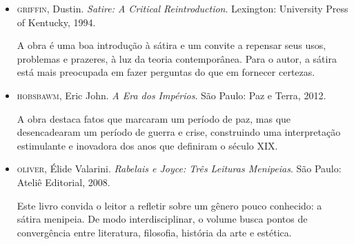 \documentclass[12pt]{extarticle}
\begin{document}
\begin{itemize}
\item\textsc{griffin}, Dustin. \textit{Satire: A Critical Reintroduction}. Lexington:
University Press of Kentucky, 1994.

A obra é uma boa introdução à sátira e um convite a repensar seus usos,
problemas e prazeres, à luz da teoria contemporânea. Para o autor, a
sátira está mais preocupada em fazer perguntas do que em fornecer
certezas.

\item\textsc{hobsbawm}, Eric John. \textit{A Era dos Impérios}. São Paulo: Paz e Terra, 2012.

A obra destaca fatos que marcaram um período de paz, mas que
desencadearam um período de guerra e crise, construindo uma
interpretação estimulante e inovadora dos anos que definiram o século
XIX.

\item\textsc{oliver}, Élide Valarini. \textit{Rabelais e Joyce: Três Leituras
Menipeias}. São Paulo: Ateliê Editorial, 2008.

Este livro convida o leitor a refletir sobre um gênero pouco conhecido:
a sátira menipeia. De modo interdisciplinar, o volume busca pontos de
convergência entre literatura, filosofia, história da arte e estética.
\end{itemize}
\end{document}
